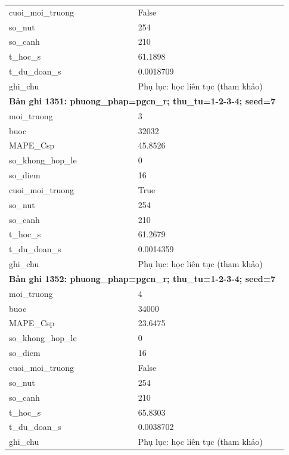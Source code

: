 \begin{longtable}{p{0.43\linewidth}p{0.50\linewidth}}
cuoi\_\allowbreak moi\_\allowbreak truong & False \\
so\_\allowbreak nut & 254 \\
so\_\allowbreak canh & 210 \\
t\_\allowbreak hoc\_\allowbreak s & 61.1898 \\
t\_\allowbreak du\_\allowbreak doan\_\allowbreak s & 0.0018709 \\
ghi\_\allowbreak chu & Phụ lục: học liên tục (tham khảo) \\
\midrule
\multicolumn{2}{p{0.95\linewidth}}{\textbf{Bản ghi 1351: phuong\_phap=pgcn\_r; thu\_tu=1-2-3-4; seed=7}} \\
moi\_\allowbreak truong & 3 \\
buoc & 32032 \\
MAPE\_\allowbreak Csp & 45.8526 \\
so\_\allowbreak khong\_\allowbreak hop\_\allowbreak le & 0 \\
so\_\allowbreak diem & 16 \\
cuoi\_\allowbreak moi\_\allowbreak truong & True \\
so\_\allowbreak nut & 254 \\
so\_\allowbreak canh & 210 \\
t\_\allowbreak hoc\_\allowbreak s & 61.2679 \\
t\_\allowbreak du\_\allowbreak doan\_\allowbreak s & 0.0014359 \\
ghi\_\allowbreak chu & Phụ lục: học liên tục (tham khảo) \\
\midrule
\multicolumn{2}{p{0.95\linewidth}}{\textbf{Bản ghi 1352: phuong\_phap=pgcn\_r; thu\_tu=1-2-3-4; seed=7}} \\
moi\_\allowbreak truong & 4 \\
buoc & 34000 \\
MAPE\_\allowbreak Csp & 23.6475 \\
so\_\allowbreak khong\_\allowbreak hop\_\allowbreak le & 0 \\
so\_\allowbreak diem & 16 \\
cuoi\_\allowbreak moi\_\allowbreak truong & False \\
so\_\allowbreak nut & 254 \\
so\_\allowbreak canh & 210 \\
t\_\allowbreak hoc\_\allowbreak s & 65.8303 \\
t\_\allowbreak du\_\allowbreak doan\_\allowbreak s & 0.0038702 \\
ghi\_\allowbreak chu & Phụ lục: học liên tục (tham khảo) \\

\end{longtable}
